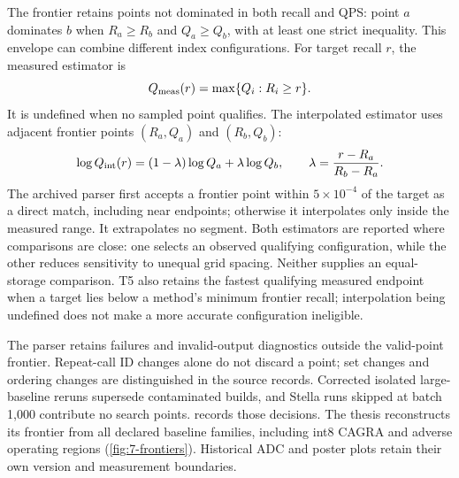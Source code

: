 The frontier retains points not dominated in both recall and QPS: point
$a$ dominates $b$ when $R_a\geq R_b$ and $Q_a\geq Q_b$, with at least one
strict inequality. This envelope can combine different index configurations.
For target recall $r$, the measured estimator is
\begin{equation}
Q_{\rm meas}(r)=\max\{Q_i:R_i\geq r\}.
\label{eq:3-measured-frontier}
\end{equation}
It is undefined when no sampled point qualifies. The interpolated estimator
uses adjacent frontier points $(R_a,Q_a)$ and $(R_b,Q_b)$:
\begin{equation}
\log Q_{\rm int}(r)=(1-\lambda)\log Q_a+\lambda\log Q_b,
\qquad \lambda=\frac{r-R_a}{R_b-R_a}.
\label{eq:3-interpolated-frontier}
\end{equation}
The archived parser first accepts a frontier point within $5\times10^{-4}$
of the target as a direct match, including near endpoints; otherwise it
interpolates only inside the measured range. It extrapolates no segment.
Both estimators are reported where comparisons are close: one selects an
observed qualifying configuration, while the other reduces sensitivity to
unequal grid spacing. Neither supplies an equal-storage comparison.
T5 also retains the fastest qualifying measured endpoint when a target
lies below a method's minimum frontier recall; interpolation being
undefined does not make a more accurate configuration ineligible.

The parser retains failures and invalid-output diagnostics outside the
valid-point frontier. Repeat-call ID changes alone do not discard a point;
set changes and ordering changes are distinguished in the source records.
Corrected isolated large-baseline reruns supersede contaminated builds,
and Stella runs skipped at batch 1,000 contribute no search points.
 records those decisions. The thesis reconstructs
its frontier from all declared baseline families, including int8 CAGRA and
adverse operating regions (\cref{fig:7-frontiers}). Historical ADC and poster
plots retain their own version and measurement boundaries.
